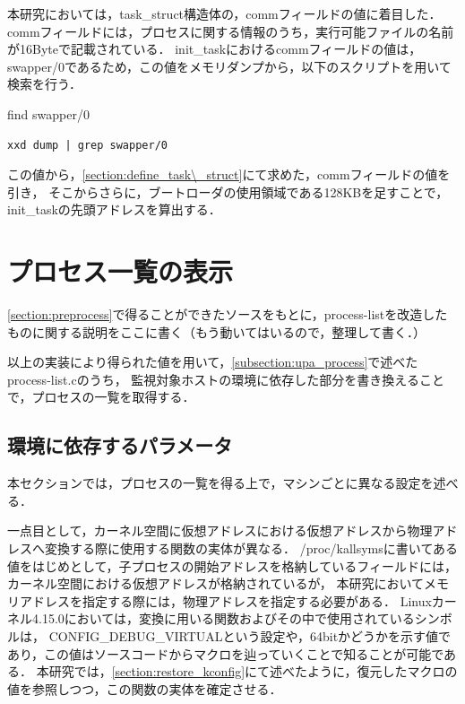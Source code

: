 本研究においては，task\_struct構造体の，commフィールドの値に着目した．
commフィールドには，プロセスに関する情報のうち，実行可能ファイルの名前が16Byteで記載されている．
init_taskにおけるcommフィールドの値は，swapper/0であるため，この値をメモリダンプから，以下のスクリプトを用いて検索を行う．

\begin{itembox}[l]{find swapper/0}
    \begin{verbatim}
xxd dump | grep swapper/0
    \end{verbatim}
\end{itembox}

この値から，\ref{section:define_task\_struct}にて求めた，commフィールドの値を引き，
そこからさらに，ブートローダの使用領域である128KBを足すことで，init_taskの先頭アドレスを算出する．



\section{プロセス一覧の表示}

\ref{section:preprocess}で得ることができたソースをもとに，process-listを改造したものに関する説明をここに書く（もう動いてはいるので，整理して書く．）

以上の実装により得られた値を用いて，\ref{subsection:upa_process}で述べたprocess-list.cのうち，
監視対象ホストの環境に依存した部分を書き換えることで，プロセスの一覧を取得する．

\subsection{環境に依存するパラメータ}

本セクションでは，プロセスの一覧を得る上で，マシンごとに異なる設定を述べる．

一点目として，カーネル空間に仮想アドレスにおける仮想アドレスから物理アドレスへ変換する際に使用する関数の実体が異なる．
/proc/kallsymsに書いてある値をはじめとして，子プロセスの開始アドレスを格納しているフィールドには，カーネル空間における仮想アドレスが格納されているが，
本研究においてメモリアドレスを指定する際には，物理アドレスを指定する必要がある．
Linuxカーネル4.15.0においては，変換に用いる関数およびその中で使用されているシンボルは，
CONFIG_DEBUG_VIRTUALという設定や，64bitかどうかを示す値であり，この値はソースコードからマクロを辿っていくことで知ることが可能である．
本研究では，\ref{section:restore_kconfig}にて述べたように，復元したマクロの値を参照しつつ，この関数の実体を確定させる．

